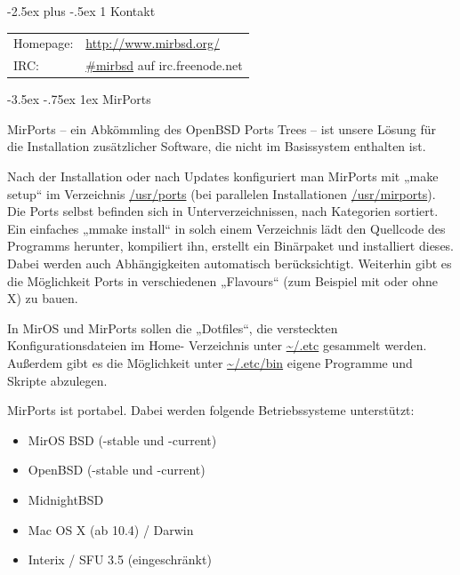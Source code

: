 \documentclass[a4paper,landscape,11pt,notumble]{leaflet}
\makeatletter
\newcommand{\sectbox}[1]{%
 \noindent\protect\colorbox{yellow}{%
 \@tempdima=\hsize
 \advance\@tempdima by-2\fboxsep
 \advance\@tempdima by-2\fboxrule
 \protect\parbox{\@tempdima}{%
 \medskip
 \raggedright %
 #1 \medskip
}}}
\renewcommand\section{\@startsection{section}{1}{0.9em}%
  {-3.5ex \@plus -.75ex}%
  {1ex} %
  {\normalfont\Large\itshape\sectbox}}
\newcommand\mysubsection{\@startsection{subsection}{2}{1em}%
  {-2.5ex plus -.5ex}%
  {1\p@} %
  {\normalfont\Large\itshape\color{darkred}}}
\renewcommand\subsection[1]{\mysubsection{#1}{\color{LIGHTGRAY}{\vspace{2pt}\hrule height 1pt}\vspace{3pt}}}
\newlength\oldfbs
\newcommand\graybox{\setlength\oldfbs\fboxsep%
 \setlength\fboxsep{0pt}%
 \noindent\fbox{\color{LIGHTGRAY}\rule{\columnwidth}{1ex}}%
 \setlength\fboxsep\oldfbs}
\makeatother
\begin{document}
\subsection{Kontakt}
{\large
\begin{tabular}{ll}
Homepage: & \textcolor{darkred}{\url{http://www.mirbsd.org/}}\\
IRC: & \textcolor{darkred}{\url{#mirbsd}} auf irc.freenode.net\\
\end{tabular}
\par}
\vspace{3ex}%
\graybox

\newpage

\section{MirPorts}

MirPorts -- ein Abkömmling des OpenBSD Ports Trees -- ist unsere Lösung für die Installation zusätzlicher Software, die nicht im Basissystem enthalten ist.

Nach der Installation oder nach Updates konfiguriert man MirPorts mit „make setup“ im Verzeichnis \url{/usr/ports} (bei parallelen Installationen \url{/usr/mirports}). Die Ports selbst befinden sich in Unterverzeichnissen, nach Kategorien sortiert. Ein einfaches „mmake install“ in solch einem Verzeichnis lädt den Quellcode des Programms herunter, kompiliert ihn, erstellt ein Binärpaket und installiert dieses. Dabei werden auch Abhängigkeiten automatisch berücksichtigt. Weiterhin gibt es die Möglichkeit Ports in verschiedenen „Flavours“ (zum Beispiel mit oder ohne X) zu bauen.

In MirOS und MirPorts sollen die „Dotfiles“, die versteckten Konfigurationsdateien im Home- Verzeichnis unter \url{~/.etc} gesammelt werden. Außerdem gibt es die Möglichkeit unter \url{~/.etc/bin} eigene Programme und Skripte abzulegen.

MirPorts ist portabel. Dabei werden folgende Betriebssysteme unterstützt:

\begin{itemize}
\item MirOS BSD (-stable und -current)
\item OpenBSD (-stable und -current)
\item MidnightBSD
\item Mac OS X (ab 10.4) / Darwin
\item Interix / SFU 3.5 (eingeschränkt)
\end{itemize}
\end{document}
